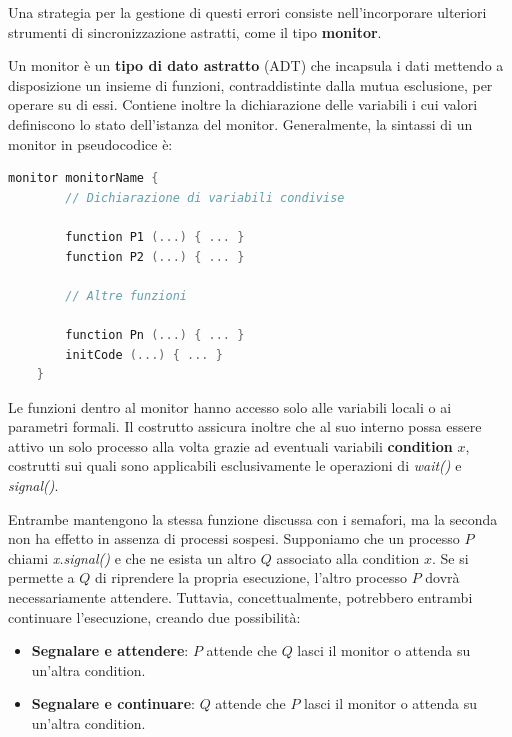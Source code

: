 \noindent Una strategia per la gestione di questi errori consiste nell'incorporare ulteriori strumenti di sincronizzazione astratti, come il tipo
\textbf{monitor}.\par
Un monitor è un \textbf{tipo di dato astratto} (ADT) che incapsula i dati mettendo a disposizione un insieme di funzioni, contraddistinte dalla mutua
esclusione, per operare su di essi. Contiene inoltre la dichiarazione delle variabili i cui valori definiscono lo stato dell'istanza del monitor.
Generalmente, la sintassi di un monitor in pseudocodice è: \begin{lstlisting}[language=C]
    monitor monitorName {
        // Dichiarazione di variabili condivise

        function P1 (...) { ... }
        function P2 (...) { ... }

        // Altre funzioni

        function Pn (...) { ... }
        initCode (...) { ... }
    }
\end{lstlisting}

\noindent Le funzioni dentro al monitor hanno accesso solo alle variabili locali o ai parametri formali. Il costrutto assicura inoltre che al suo
interno possa essere attivo un solo processo alla volta grazie ad eventuali variabili \textbf{condition} $x$, costrutti sui quali sono applicabili
esclusivamente le operazioni di \textit{wait()} e \textit{signal()}.\par
Entrambe mantengono la stessa funzione discussa con i semafori, ma la seconda non ha effetto in assenza di processi sospesi. Supponiamo che un processo
$P$ chiami \textit{x.signal()} e che ne esista un altro $Q$ associato alla condition $x$. Se si permette a $Q$ di riprendere la propria esecuzione,
l'altro processo $P$ dovrà necessariamente attendere. Tuttavia, concettualmente, potrebbero entrambi continuare l'esecuzione, creando due
possibilità: \begin{itemize}
    \item \textbf{Segnalare e attendere}: $P$ attende che $Q$ lasci il monitor o attenda su un'altra condition.
    \item \textbf{Segnalare e continuare}: $Q$ attende che $P$ lasci il monitor o attenda su un'altra condition.
\end{itemize}

